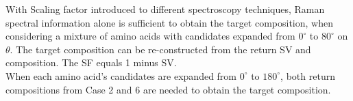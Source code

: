 With Scaling factor introduced to different spectroscopy techniques, Raman spectral information alone is sufficient to obtain the target composition, when considering a mixture of amino acids with candidates expanded from $0^{\circ}$ to $80^{\circ}$ on $\theta$. The target composition can be re-constructed from the return SV and composition. The SF equals 1 minus SV. \\

When each amino acid's candidates are expanded from $0^{\circ}$ to $180^{\circ}$, both return compositions from Case 2 and 6 are needed to obtain the target composition. \\
